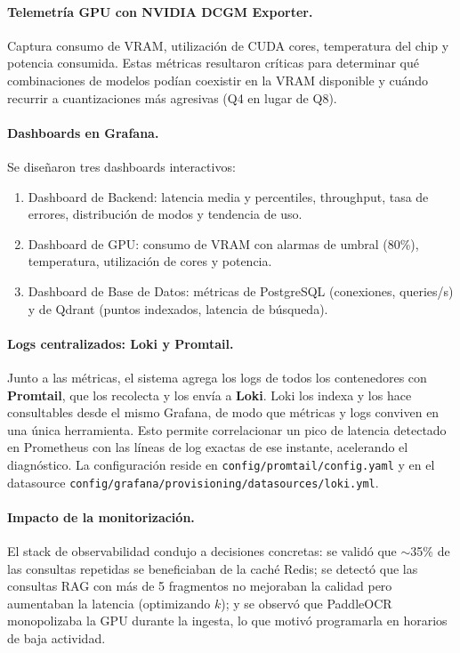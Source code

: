 \paragraph{Telemetría GPU con NVIDIA DCGM Exporter.} Captura consumo de VRAM, utilización de CUDA cores, temperatura del chip y potencia consumida. Estas métricas resultaron críticas para determinar qué combinaciones de modelos podían coexistir en la VRAM disponible y cuándo recurrir a cuantizaciones más agresivas (Q4 en lugar de Q8).

\paragraph{Dashboards en Grafana.} Se diseñaron tres dashboards interactivos:
\begin{enumerate}
    \item Dashboard de Backend: latencia media y percentiles, throughput, tasa de errores, distribución de modos y tendencia de uso.
    \item Dashboard de GPU: consumo de VRAM con alarmas de umbral (80\%), temperatura, utilización de cores y potencia.
    \item Dashboard de Base de Datos: métricas de PostgreSQL (conexiones, queries/s) y de Qdrant (puntos indexados, latencia de búsqueda).
\end{enumerate}

\paragraph{Logs centralizados: Loki y Promtail.} Junto a las métricas, el sistema agrega los logs de todos los contenedores con \textbf{Promtail}, que los recolecta y los envía a \textbf{Loki}. Loki los indexa y los hace consultables desde el mismo Grafana, de modo que métricas y logs conviven en una única herramienta. Esto permite correlacionar un pico de latencia detectado en Prometheus con las líneas de log exactas de ese instante, acelerando el diagnóstico. La configuración reside en \texttt{config/promtail/config.yaml} y en el datasource \texttt{config/grafana/provisioning/datasources/loki.yml}.

\paragraph{Impacto de la monitorización.} El stack de observabilidad condujo a decisiones concretas: se validó que $\sim$35\% de las consultas repetidas se beneficiaban de la caché Redis; se detectó que las consultas RAG con más de 5 fragmentos no mejoraban la calidad pero aumentaban la latencia (optimizando $k$); y se observó que PaddleOCR monopolizaba la GPU durante la ingesta, lo que motivó programarla en horarios de baja actividad.

